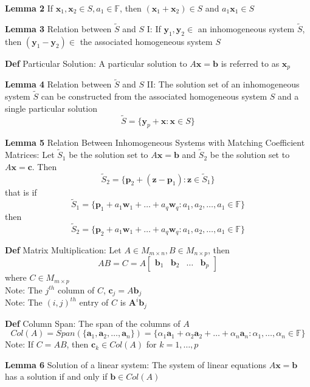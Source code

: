 \documentclass[11pt,notitlepage]{report}
\newcommand{\bb}[1]{\ensuremath{\mathbb{#1}}}
\newcommand{\tbf}[1]{\textbf{#1}}
\begin{document}
\textbf{Lemma 2} If $\tbf x_1, \tbf x_2 \in S, a_1 \in \bb F$, then $(\tbf x_1 + \tbf x_2) \in S$ and $a_1\tbf x_1 \in S$

\textbf{Lemma 3} Relation between $\tilde S$ and $S$ I: If $\tbf y_1, \tbf y_2 \in$ an inhomogeneous system $\tilde S$, then $(\tbf y_1 - \tbf y_2) \in $ the associated homogeneous system $S$

\textbf{Def} Particular Solution: A particular solution to $A\tbf x = \tbf b$ is referred to as $\tbf x_p$

\textbf{Lemma 4} Relation between $\tilde S$ and $S$ II: The solution set of an inhomogeneous system $\tilde S$ can be constructed from the associated homogeneous system $S$ and a single particular solution
$$\tilde S = \{\tbf y_p + \tbf x: \tbf x \in S\}$$


\textbf{Lemma 5} Relation Between Inhomogeneous Systems with Matching Coefficient Matrices: Let $\tilde S_1$ be the solution set to $A\tbf x = \tbf b$ and $\tilde S_2$ be the solution set to $A\tbf x = \tbf c$. Then
$$\tilde S_2 = \{\tbf p_2 + (\tbf z - \tbf p _1) : \tbf z \in \tilde S_1\}$$
that is if 
$$\tilde S_1 = \{\tbf p_1 + a_1\tbf w_1 + \dots + a_q\tbf w_q: a_1, a_2, \dots, a_1 \in \bb F\}$$
then
$$\tilde S_2 = \{\tbf p_2 + a_1\tbf w_1 + \dots + a_q\tbf w_q: a_1, a_2, \dots, a_1 \in \bb F\}$$


\textbf{Def} Matrix Multiplication: Let $A \in M_{m \times n}, B \in M_{n \times p}$, then
$$AB = C = A\begin{bmatrix}
\tbf b_1 & \tbf b_2 & \dots & \tbf b_p
\end{bmatrix}$$
where $C \in M_{m \times p}$\\
\hspace*{5mm} Note: The $j^{th}$ column of $C$, $\tbf c_j = A \tbf b_j$\\
\hspace*{5mm} Note: The $(i, j)^{th}$ entry of $C$ is $\tbf A^i\tbf b_j$

\textbf{Def} Column Span: The span of the columns of $A$
$$Col(A) = Span(\{\tbf a_1, \tbf a_2, \dots, \tbf a_n\}) = \{\alpha_1\tbf a_1 + \alpha_2 \tbf a_2 + \dots + \alpha_n \tbf a_n : \alpha_1, \dots, \alpha_n \in \bb F\}$$
\hspace*{5mm} Note: If $C = AB$, then $\tbf c_k \in Col(A)$ for $k = 1, \dots, p$


\textbf{Lemma 6} Solution of a linear system: The system of linear equations $A \tbf x = \tbf b$ has a solution if and only if $\tbf b \in Col(A)$
\end{document}
